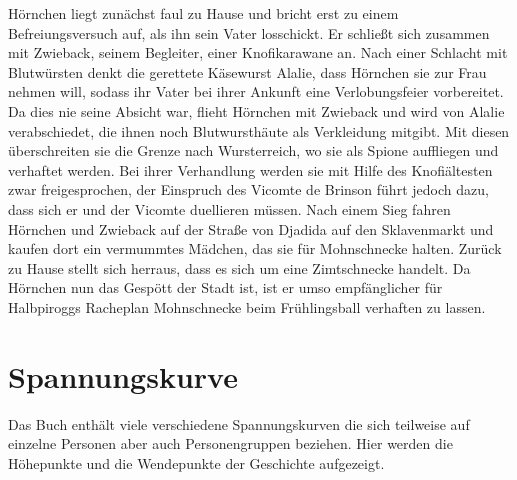 Hörnchen liegt zunächst faul zu Hause und bricht erst zu einem Befreiungsversuch auf, als ihn sein Vater losschickt. Er schließt sich zusammen mit Zwieback, seinem Begleiter, einer Knofikarawane an. Nach einer Schlacht mit Blutwürsten denkt die gerettete Käsewurst Alalie, dass Hörnchen sie zur Frau nehmen will, sodass ihr Vater bei ihrer Ankunft eine Verlobungsfeier vorbereitet. Da dies nie seine Absicht war, flieht Hörnchen mit Zwieback und wird von Alalie verabschiedet, die ihnen noch Blutwursthäute als Verkleidung mitgibt. Mit diesen überschreiten sie die Grenze nach Wursterreich, wo sie als Spione auffliegen und verhaftet werden. Bei ihrer Verhandlung werden sie mit Hilfe des Knofiältesten zwar freigesprochen, der Einspruch des Vicomte de Brinson führt jedoch dazu, dass sich er und der Vicomte duellieren müssen. Nach einem Sieg fahren Hörnchen und Zwieback auf der Straße von Djadida auf den Sklavenmarkt und kaufen dort ein vermummtes Mädchen, das sie für Mohnschnecke halten. Zurück zu Hause stellt sich herraus, dass es sich um eine Zimtschnecke handelt. Da Hörnchen nun das Gespött der Stadt ist, ist er umso empfänglicher für Halbpiroggs Racheplan Mohnschnecke beim Frühlingsball verhaften zu lassen.


\section{Spannungskurve}

Das Buch enthält viele verschiedene Spannungskurven die sich teilweise auf einzelne Personen aber auch Personengruppen beziehen. Hier werden die Höhepunkte und die Wendepunkte der Geschichte aufgezeigt.

